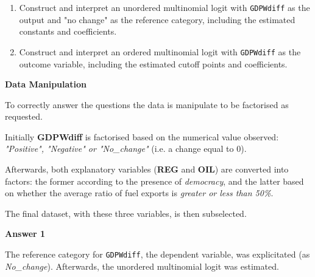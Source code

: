 \documentclass[12pt,letterpaper]{article}
\begin{document}
\begin{enumerate}
	\item Construct and interpret an unordered multinomial logit with \texttt{GDPWdiff} as the output and "no change" as the reference category, including the estimated constants and coefficients.
	\item Construct and interpret an ordered multinomial logit with \texttt{GDPWdiff} as the outcome variable, including the estimated cutoff points and coefficients.
	
	
\end{enumerate}

\vspace{2cm}
\noindent\textbf{Data Manipulation}

\noindent To correctly answer the questions the data is manipulate to be factorised as requested. 

\noindent Initially \textbf{GDPWdiff} is factorised based on the numerical value observed: \emph{"Positive", "Negative" or "No\_change"} (i.e. a change equal to 0).

\vspace{0.5cm}


\vspace{0.5cm}
\noindent Afterwards, both explanatory variables (\textbf{REG} and \textbf{OIL}) are converted into factors: the former according to the presence of \emph{democracy}, and the latter based on whether the average ratio of fuel exports is \emph{greater or less than 50\%}.

\noindent The final dataset, with these three variables, is then subselected.

\vspace{0.5cm}


\vspace{2cm}
\noindent\textbf{Answer 1}\\
\vspace{0.5cm}

\noindent The reference category for \texttt{GDPWdiff}, the dependent variable, was explicitated (as \emph{No\_change}). Afterwards, the unordered multinomial logit was estimated. 

\vspace{0.5cm}


\vspace{0.5cm}
\end{document}

